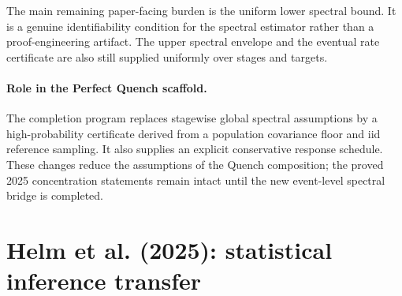 \documentclass[11pt]{article}
\begin{document}
The main remaining paper-facing burden is the uniform lower spectral bound.  It
is a genuine identifiability condition for the spectral estimator rather than a
proof-engineering artifact.  The upper spectral envelope and the eventual rate
certificate are also still supplied uniformly over stages and targets.


\paragraph{Role in the Perfect Quench scaffold.}
The completion program replaces stagewise global spectral assumptions by a
high-probability certificate derived from a population covariance floor and iid
reference sampling.  It also supplies an explicit conservative response
schedule.  These changes reduce the assumptions of the Quench composition; the
proved 2025 concentration statements remain intact until the new event-level
spectral bridge is completed.

\section{Helm et al. (2025): statistical inference transfer}
\end{document}
